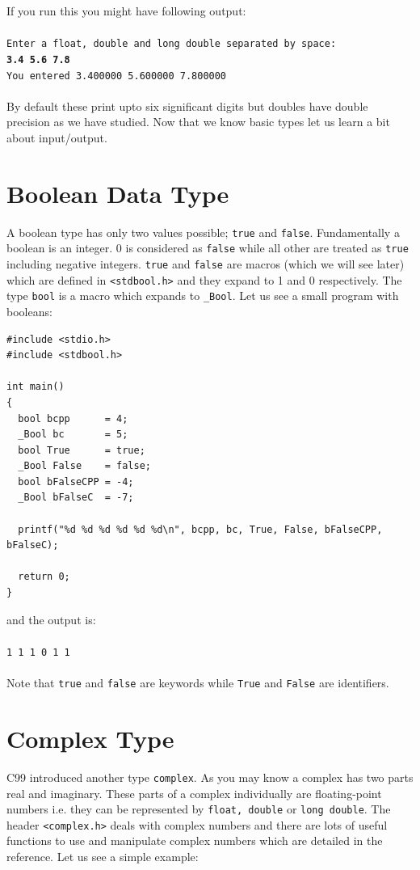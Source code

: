 If you run this you might have following output:
\\\\\texttt{Enter a float, double and long double separated by space:\\
\textbf{3.4 5.6 7.8}\\
You entered 3.400000 5.600000 7.800000\\\\}
By default these print upto six significant digits but doubles have double
precision as we have studied. Now that we know basic types let us learn a bit
about input/output.

\section{Boolean Data Type}
A boolean type has only two values possible; \texttt{true} and
\texttt{false}. Fundamentally a boolean is an integer. 0 is considered as
\texttt{false} while all other are treated as \texttt{true} including negative
integers. \texttt{true} and \texttt{false} are macros (which we will see later)
which are defined in \texttt{<stdbool.h>} and they expand to 1 and 0
respectively. The type \texttt{bool} is a macro which expands to
\texttt{\_Bool}. Let us see a small program with booleans:

\begin{Verbatim}[frame=single]
#include <stdio.h>
#include <stdbool.h>

int main()
{
  bool bcpp      = 4;
  _Bool bc       = 5;
  bool True      = true;
  _Bool False    = false;
  bool bFalseCPP = -4;
  _Bool bFalseC  = -7;

  printf("%d %d %d %d %d %d\n", bcpp, bc, True, False, bFalseCPP, bFalseC);

  return 0;
}
\end{Verbatim}

and the output is:
\\\\\texttt{1 1 1 0 1 1\\\\}
Note that \texttt{true} and \texttt{false} are keywords while \texttt{True} and
\texttt{False} are identifiers.

\section{Complex Type}
C99 introduced another type \texttt{complex}. As you may know a complex has two
parts real and imaginary. These parts of a complex individually are
floating-point numbers i.e. they can be represented by \texttt{float, double}
or \texttt{long double}. The header \texttt{<complex.h>} deals with complex
numbers and there are lots of useful functions to use and manipulate complex
numbers which are detailed in the reference. Let us see a simple example:

